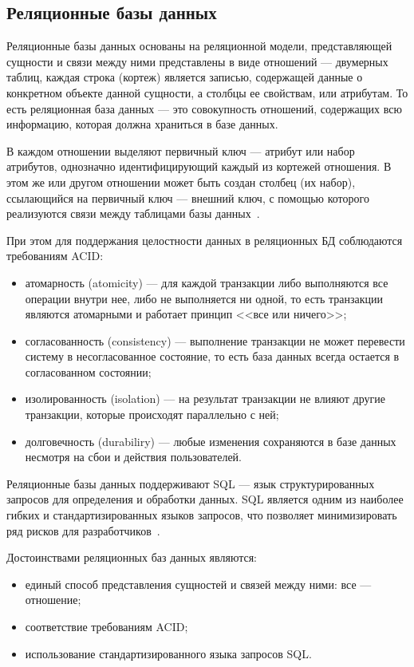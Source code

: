 \subsection{Реляционные базы данных}

Реляционные базы данных основаны на реляционной модели, представляющей сущности
и связи между ними представлены в виде отношений --- двумерных таблиц, каждая
строка (кортеж) является записью, содержащей данные о конкретном объекте данной
сущности, а столбцы ее свойствам, или атрибутам. То есть реляционная база данных
--- это совокупность отношений, содержащих всю информацию, которая должна
храниться в базе данных.

В каждом отношении выделяют первичный ключ --- атрибут или набор атрибутов,
однозначно идентифицирующий каждый из кортежей отношения. В этом же или другом
отношении может быть создан столбец (их набор), ссылающийся на первичный ключ
--- внешний ключ, с помощью которого реализуются связи между таблицами базы
данных~\cite{book03}.

При этом для поддержания целостности данных в реляционных БД соблюдаются
требованиям ACID:
\begin{itemize}
    \item атомарность (atomicity) --- для каждой транзакции либо выполняются все
        операции внутри нее, либо не выполняется ни одной, то есть
        транзакции являются атомарными и работает принцип <<все или ничего>>;
    \item согласованность (consistency) --- выполнение транзакции не может
        перевести систему в несогласованное состояние, то есть база данных
        всегда остается в согласованном состоянии;
    \item изолированность (isolation) --- на результат транзакции не влияют
        другие транзакции, которые происходят параллельно с ней;
    \item долговечность (durabiliry) --- любые изменения сохраняются в базе
        данных несмотря на сбои и действия пользователей.
\end{itemize}

Реляционные базы данных поддерживают SQL --- язык структурированных запросов для
определения и обработки данных. SQL является одним из наиболее гибких и
стандартизированных языков запросов, что позволяет минимизировать ряд рисков
для разработчиков~\cite{art04}.

Достоинствами реляционных баз данных являются:
\begin{itemize}
    \item единый способ представления сущностей и связей между ними:
        все --- отношение;
    \item соответствие требованиям ACID;
    \item использование стандартизированного языка запросов SQL.
\end{itemize}

